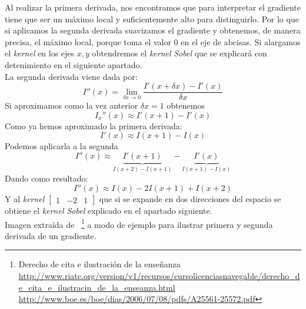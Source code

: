 Al realizar la primera derivada, nos encontramos que para interpretar
el gradiente tiene que ser un máximo local y suficientemente alto para
distinguirlo. Por lo que si aplicamos la segunda derivada suavizamos
el gradiente y obtenemos, de manera precisa, el máximo local, porque
toma el valor $0$ en el eje de abcisas. Si alargamos el \emph{kernel}
en los ejes $x, y$ obtendremos el \emph{kernel}
\emph{Sobel} que se explicará con detenimiento en el siguiente apartado. \\
La segunda derivada viene dada por:
\begin{equation*}
  I''(x) = \lim_{\delta x \to 0}\frac{I'(x+\delta x) - I'(x)}{\delta x}
\end{equation*}
Si aproximamos como la vez anterior $\delta x = 1$ obtenemos
\begin{equation*}
  I_x''(x) \approx I'(x + 1) - I'(x)
\end{equation*}
Como ya hemos aproximado la primera derivada:
\begin{equation*}
  I'(x) \approx I(x + 1) - I(x)
\end{equation*}
Podemos aplicarla a la segunda
\begin{equation*}
  I''(x) \approx \underbrace{I'(x + 1)}_{I(x + 2) - I(x + 1)} - \underbrace{I'(x)}_{I(x + 1) - I(x)}
\end{equation*}
Dando como resultado:
\begin{equation*}
  I''(x) \approx I(x) - 2I(x + 1) + I(x + 2)
\end{equation*}
Y al \emph{kernel} $\begin{bmatrix} 1 & -2 & 1 \end{bmatrix}$ que si
se expande en dos direcciones del espacio se obtiene el \emph{kernel
  Sobel} explicado en el apartado siguiente.\\
Imagen extraída de \emph{\citep*{opencv_book-bib}}~\footnote{Derecho
  de
  cita e ilustración de la enseñanza\\
  \url{http://www.riate.org/version/v1/recursos/cursolicenciasnavegable/derecho_de_cita_e_ilustracin_de_la_enseanza.html}\\
  \url{http://www.boe.es/boe/dias/2006/07/08/pdfs/A25561-25572.pdf}} a
modo de ejemplo para ilustrar primera y segunda derivada de un
gradiente.

